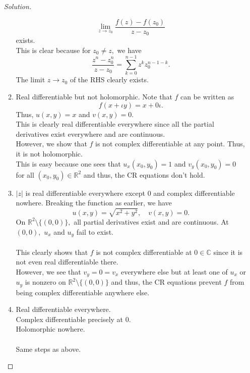 \documentclass[12pt]{article}
\theoremstyle{definition}
\numberwithin{thm}{section}
\newenvironment{soln}{\begin{proof}[Solution]}{\end{proof}}
\begin{document}
\begin{enumerate}
\begin{soln}
\begin{enumerate}
\begin{equation*}
				\lim_{z\to z_0}\dfrac{f(z) - f(z_0)}{z - z_0}
			\end{equation*}
			exists.\\
			This is clear because for $z_0 \neq z,$ we have
			\begin{equation*} 
				\dfrac{z^n - z_0^n}{z - z_0} = \sum_{k=0}^{n-1}z^kz_0^{n - 1 - k}.
			\end{equation*}
			The limit $z \longrightarrow z_0$ of the RHS clearly exists.
			\item Real differentiable but not holomorphic. Note that $f$ can be written as
			\begin{equation*} 
				f(x + \iota y) = x + 0\iota.
			\end{equation*}
			Thus, $u(x, y) = x$ and $v(x, y) = 0.$\\
			This is clearly real differentiable everywhere since all the partial derivatives exist everywhere and are continuous.\\
			However, we show that $f$ is not complex differentiable at any point. Thus, it is not holomorphic.\\
			This is easy because one sees that $u_x(x_0, y_0) = 1$ and $v_y(x_0, y_0) = 0$ for all $(x_0, y_0) \in \mathbb{R}^2$ and thus, the CR equations don't hold.
			\item $|z|$ is real differentiable everywhere except $0$ and complex differentiable nowhere. Breaking the function as earlier, we have
			\begin{equation*} 
				u(x, y) = \sqrt{x^2 + y^2}, \quad v(x, y) = 0.
			\end{equation*}
			On $\mathbb{R}^2\setminus\{(0, 0)\},$ all partial derivatives exist and are continuous. At $(0, 0),$ $u_x$ and $u_y$ fail to exist.\\~\\
			This clearly shows that $f$ is not complex differentiable at $0 \in \mathbb{C}$ since it is not even real differentiable there.\\
			However, we see that $v_y = 0 = v_x$ everywhere else but at least one of $u_x$ or $u_y$ is nonzero on $\mathbb{R}^2\setminus\{(0, 0)\}$ and thus, the CR equations prevent $f$ from being complex differentiable anywhere else.
			\item Real differentiable everywhere.\\
			Complex differentiable precisely at $0.$\\
			Holomorphic nowhere.\\~\\
			Same steps as above.

\end{enumerate}
\end{soln}
\end{enumerate}
\end{document}
